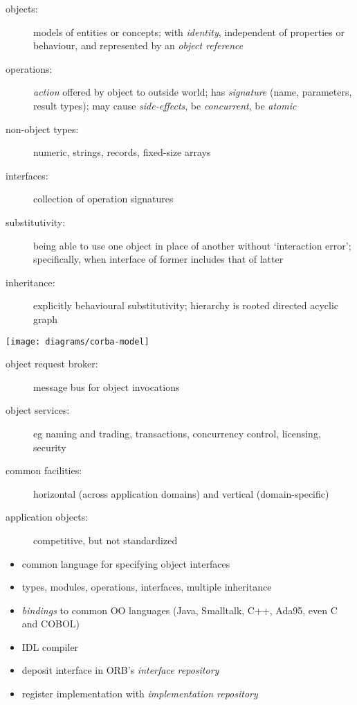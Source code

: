 \documentclass{sepslide-soa-faked} %
\begin{document}
\begin{slide}
\begin{description}
\item[objects:]
models of entities or concepts;
with \emph{identity}, independent of properties or behaviour, 
and represented by an \emph{object reference}
\item[operations:]
\emph{action} offered by object to outside world;
has \emph{signature} (name, parameters, result types);
may cause \emph{side-effects}, be \emph{concurrent}, be \emph{atomic}
\item[non-object types:]
numeric, strings, records, fixed-size arrays
\item[interfaces:]
collection of operation signatures
\item[substitutivity:]
being able to use one object in place of another without `interaction error';
specifically, when interface of former includes that of latter
\item[inheritance:]
explicitly behavioural substitutivity;
hierarchy is rooted directed acyclic graph
\end{description}
\end{slide}

\begin{slide}
\begin{center}
  \texttt{[image: diagrams/corba-model]}
\end{center}
\begin{description}
\item[object request broker:]
message bus for object invocations
\item[object services:]
eg naming and trading, transactions, concurrency control, licensing, security
\item[common facilities:]
horizontal (across application domains) %
and vertical (domain-specific) %
\item[application objects:]
competitive, but not standardized
\end{description}
\end{slide}

\begin{slide}
\begin{itemize}
\item common language for specifying object interfaces
\item types, modules, operations, interfaces, multiple inheritance
\item \emph{bindings} to common OO languages
  (Java, Smalltalk, C++, Ada95, even C and COBOL)
\item IDL compiler 
\item deposit interface in ORB's \emph{interface repository}
\item register implementation with \emph{implementation repository}
\end{itemize}
\end{slide}
\end{document}
